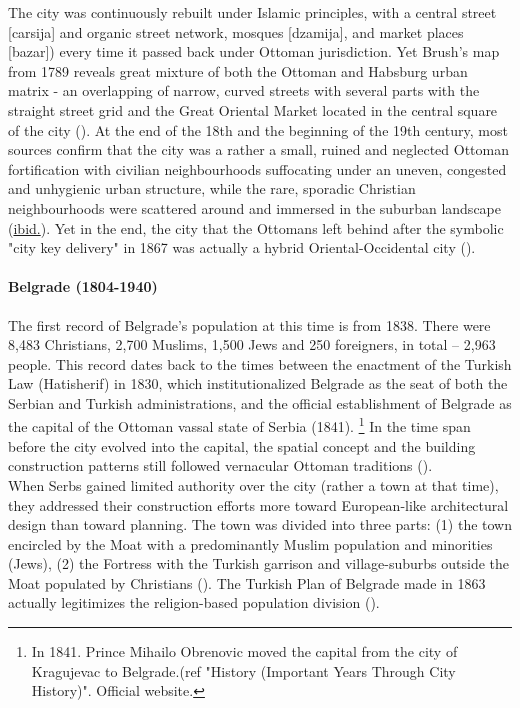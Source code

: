 \documentclass[11pt]{report}
\begin{document}
The city was continuously rebuilt under Islamic principles, with a central street [carsija] and organic street network, mosques [dzamija], and market places [bazar]) every time it passed back under Ottoman jurisdiction.
Yet Brush’s map from 1789 reveals great mixture of both the Ottoman and Habsburg urban matrix - an overlapping of narrow, curved streets with several parts with the straight street grid and the Great Oriental Market located in the central square of the city (\href{Doytchinov}{\citealt{doytchinov_modernization_2015}}).
At the end of the 18th and the beginning of the 19th century, most sources confirm that the city was a rather a small, ruined and neglected Ottoman fortification with civilian neighbourhoods suffocating under an uneven, congested and unhygienic urban structure, while the rare, sporadic Christian neighbourhoods were scattered around and immersed in the suburban landscape (\href{ref}{ibid.}).
Yet in the end, the city that the Ottomans left behind after the symbolic "city key delivery" in 1867 was actually a hybrid Oriental-Occidental city (\href{Blagojevic}{\citealt{blagojevic_urban_2009}}).

\paragraph{Belgrade (1804-1940)}

The first record of Belgrade’s population at this time is from 1838. There were 8,483 Christians, 2,700 Muslims, 1,500 Jews and 250 foreigners, in total – 2,963 people. This record dates back to the times between the enactment of the Turkish Law (Hatisherif) in 1830, which institutionalized Belgrade as the seat of both the Serbian and Turkish administrations, and the official establishment of Belgrade as the capital of the Ottoman vassal state of Serbia (1841).
\footnote{In 1841. Prince Mihailo Obrenovic moved the capital from the city of Kragujevac to Belgrade.(ref "History (Important Years Through City History)". Official website.}
In the time span before the city evolved into the capital, the spatial concept and the building construction patterns still followed vernacular Ottoman traditions (\href{Doytchinov}{\citealt{doytchinov_modernization_2015}}).
\\

When Serbs gained limited authority over the city (rather a town at that time), they addressed their construction efforts more toward European-like architectural design than toward planning. The town was divided into three parts: (1) the town encircled by the Moat with a predominantly Muslim population and minorities (Jews), (2) the Fortress with the Turkish garrison and village-suburbs outside the Moat populated by Christians (\href{Blagojevic}{\citealt{blagojevic_urban_2009}}).
The Turkish Plan of Belgrade made in 1863 actually legitimizes the religion-based population division (\href{Roter}{\citealt{doytchinov_modernization_2015}}).
\\
\end{document}
